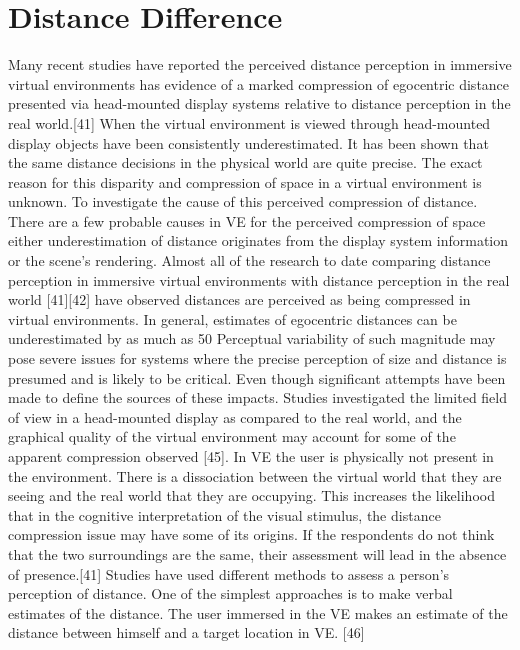 \section{Distance Difference}
Many recent studies have reported the perceived distance perception in immersive virtual environments has evidence of a marked compression of egocentric distance presented via head-mounted display systems relative to distance perception in the real world.[41]
When the virtual environment is viewed through head-mounted display objects have been consistently underestimated. It has been shown that the same distance decisions in the physical world are quite precise. The exact reason for this disparity and compression of space in a virtual environment is unknown. To investigate the cause of this perceived compression of distance. There are a few probable causes in VE for the perceived compression of space either underestimation of distance originates from the display system information or the scene’s rendering.
Almost all of the research to date comparing distance perception in immersive virtual environments with distance perception in the real world [41][42] have observed distances are perceived as being compressed in virtual environments. In general, estimates of egocentric distances can be underestimated by as much as 50%
Perceptual variability of such magnitude may pose severe issues for systems where the precise perception of size and distance is presumed and is likely to be critical. Even though significant attempts have been made to define the sources of these impacts. Studies investigated the limited field of view in a head-mounted display as compared to the real world, and the graphical quality of the virtual environment may account for some of the apparent compression observed [45].
In VE the user is physically not present in the environment. There is a dissociation between the virtual world that they are seeing and the real world that they are occupying. This increases the likelihood that in the cognitive interpretation of the visual stimulus, the distance compression issue may have some of its origins. If the respondents do not think that the two surroundings are the same, their assessment will lead in the absence of presence.[41]
Studies have used different methods to assess a person's perception of distance. One of the simplest approaches is to make verbal estimates of the distance. The user immersed in the VE makes an estimate of the distance between himself and a target location in VE. [46]
